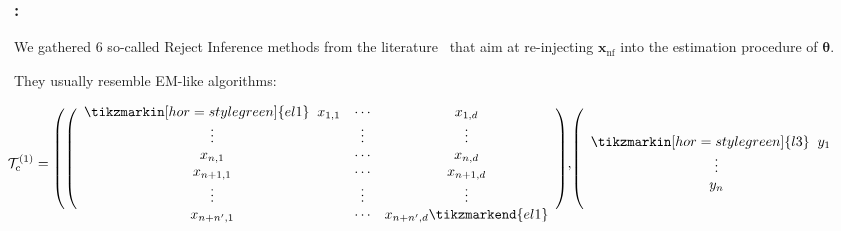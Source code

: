 \documentclass[english,xcolor={rgb,dvipsnames,table,usenames}, presentation]{beamer}
\renewcommand{\textcolor}[1]{}
\newcommand{\f}{\text{f}}
\newcommand{\nf}{\text{nf}}
\begin{document}
\begin{frame}
\frametitle{\secname : \subsecname}



\note{}




We gathered 6 so-called Reject Inference methods from the literature~\cite{economix,saporta,RI6,banasik} that aim at re-injecting $\bm{\mathbf{x}}_{\nf}$ into the estimation procedure of $\bm{\theta}$.

\medskip

They usually resemble EM-like algorithms:

{

\[ \hspace*{-0.8cm}\textcolor{white}{\mathcal{T}_{\text{c}}^{(1)} = {\Huge \Bigg(}}
\textcolor{white}{{\Huge \Bigg(}}
\begin{array}{ccc}
\tikzmarkin[hor=style green]{el1} \; \; x_{1,1} & \cdots & x_{1,d}  \\
 \vdots & \vdots & \vdots \\
 x_{n,1} & \cdots & x_{n,d} \\
 x_{n+1,1} & \cdots & x_{n+1,d}  \\
 \vdots & \vdots & \vdots \\
 x_{n+n',1} & \cdots & x_{n+n',d} \tikzmarkend{el1} \end{array} \textcolor{white}{{\Huge \Bigg)},}
\textcolor{white}{{\Huge \Bigg(}}
\begin{array}{c}
\tikzmarkin[hor=style green]{l3} \; \; y_1 \; \; \; \\
\vdots \\
 y_n \\ 

\end{array}\]}
\end{frame}
\end{document}

